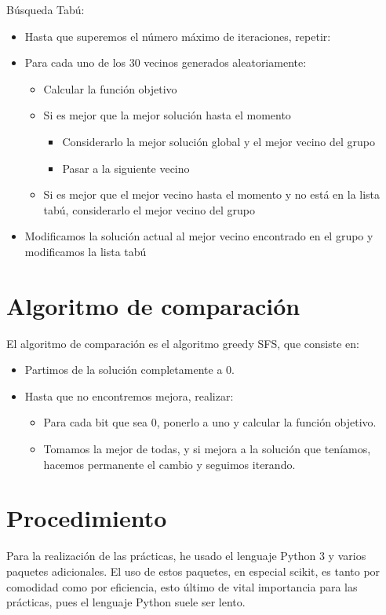 Búsqueda Tabú:
\begin{itemize}
\item Hasta que superemos el número máximo de iteraciones, repetir:
\item Para cada uno de los 30 vecinos generados aleatoriamente:
\begin{itemize}
\item Calcular la función objetivo
\item Si es mejor que la mejor solución hasta el momento
\begin{itemize}
\item Considerarlo la mejor solución global y el mejor vecino del grupo
\item Pasar a la siguiente vecino
\end{itemize}
\item Si es mejor que el mejor vecino hasta el momento y no está en la lista tabú, considerarlo el mejor vecino del grupo
\end{itemize} 
\item Modificamos la solución actual al mejor vecino encontrado en el grupo y modificamos la lista tabú
\end{itemize} 

\newpage
\section{Algoritmo de comparación}
El algoritmo de comparación es el algoritmo greedy SFS, que consiste en:
\begin{itemize}
\item Partimos de la solución completamente a 0.
\item Hasta que no encontremos mejora, realizar:
\begin{itemize}
\item Para cada bit que sea 0, ponerlo a uno y calcular la función objetivo.
\item Tomamos la mejor de todas, y si mejora a la solución que teníamos, hacemos permanente el cambio y seguimos iterando.
\end{itemize} 
\end{itemize} 
\newpage
\section{Procedimiento}
Para la realización de las prácticas, he usado el lenguaje Python 3 y varios paquetes adicionales. El uso de estos paquetes, en especial scikit, es tanto por comodidad como por eficiencia, esto último de vital importancia para las prácticas, pues el lenguaje Python suele ser lento.\\

